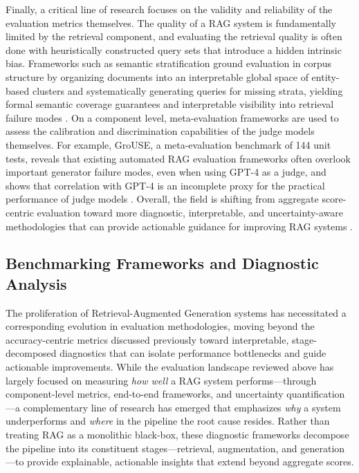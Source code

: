 \documentclass[11pt]{article}
\begin{document}
Finally, a critical line of research focuses on the validity and reliability of the evaluation metrics themselves. The quality of a RAG system is fundamentally limited by the retrieval component, and evaluating the retrieval quality is often done with heuristically constructed query sets that introduce a hidden intrinsic bias. Frameworks such as semantic stratification ground evaluation in corpus structure by organizing documents into an interpretable global space of entity-based clusters and systematically generating queries for missing strata, yielding formal semantic coverage guarantees and interpretable visibility into retrieval failure modes \cite{ref413}. On a component level, meta-evaluation frameworks are used to assess the calibration and discrimination capabilities of the judge models themselves. For example, GroUSE, a meta-evaluation benchmark of 144 unit tests, reveals that existing automated RAG evaluation frameworks often overlook important generator failure modes, even when using GPT-4 as a judge, and shows that correlation with GPT-4 is an incomplete proxy for the practical performance of judge models \cite{ref414}. Overall, the field is shifting from aggregate score-centric evaluation toward more diagnostic, interpretable, and uncertainty-aware methodologies that can provide actionable guidance for improving RAG systems \cite{ref415}.

\subsection{Benchmarking Frameworks and Diagnostic Analysis}

The proliferation of Retrieval-Augmented Generation systems has necessitated a corresponding evolution in evaluation methodologies, moving beyond the accuracy-centric metrics discussed previously toward interpretable, stage-decomposed diagnostics that can isolate performance bottlenecks and guide actionable improvements. While the evaluation landscape reviewed above has largely focused on measuring \emph{how well} a RAG system performs---through component-level metrics, end-to-end frameworks, and uncertainty quantification---a complementary line of research has emerged that emphasizes \emph{why} a system underperforms and \emph{where} in the pipeline the root cause resides. Rather than treating RAG as a monolithic black-box, these diagnostic frameworks decompose the pipeline into its constituent stages---retrieval, augmentation, and generation---to provide explainable, actionable insights that extend beyond aggregate scores.
\end{document}
